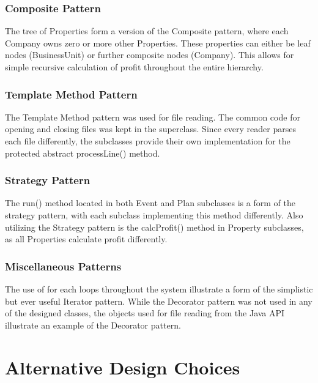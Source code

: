 \documentclass[]{article}
\begin{document}
\subsubsection*{Composite Pattern}

The tree of Properties form a version of the Composite pattern, where each Company owns zero or more other Properties. These properties can either be leaf nodes (BusinessUnit) or further composite nodes (Company). This allows for simple recursive calculation of profit throughout the entire hierarchy.

\subsubsection*{Template Method Pattern}

The Template Method pattern was used for file reading. The common code for opening and closing files was kept in the superclass. Since every reader parses each file differently, the subclasses provide their own implementation for the protected abstract processLine() method.

\subsubsection*{Strategy Pattern}

The run() method located in both Event and Plan subclasses is a form of the strategy pattern, with each subclass implementing this method differently. Also utilizing the Strategy pattern is the calcProfit() method in Property subclasses, as all Properties calculate profit differently.

\subsubsection*{Miscellaneous Patterns}

The use of for each loops throughout the system illustrate a form of the simplistic but ever useful Iterator pattern. While the Decorator pattern was not used in any of the designed classes, the objects used for file reading from the Java API illustrate an example of the Decorator pattern.


\break
\section*{Alternative Design Choices}
\end{document}
